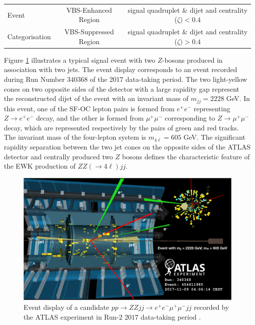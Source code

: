 \begin{table}[!htbp]
\begin{tabular}{|| l || c | c ||}
        Event               & VBS-Enhanced Region       & signal quadruplet $\&$ dijet and centrality ($\zeta) < 0.4 $              \\
        Categorisation          & VBS-Suppressed Region     & signal quadruplet $\&$ dijet and centrality ($\zeta) > 0.4$               \\
        
        \hline
    \end{tabular}
\end{table}

Figure \ref{fig:EventDisplayZZjj} illustrates a typical signal event with two $Z$-bosons produced in association with two jets. The event display corresponds to an event recorded during Run Number $340368$ of the 2017 data-taking period. The two light-yellow cones on two opposite sides of the detector with a large rapidity gap represent the reconstructed dijet of the event with an invariant mass of $m_{jj} = 2228$ GeV. In this event, one of the SF-OC lepton pairs is formed from $e^+e^-$ representing $Z\rightarrow e^+e^-$ decay, and the other is formed from $\mu^+\mu^-$ corresponding to $Z\rightarrow \mu^+\mu^-$ decay, which are represented respectively by the pairs of green and red tracks. The invariant mass of the four-lepton system is $m_{4\ell} = 605$ GeV. The significant rapidity separation between the two jet cones on the opposite sides of the ATLAS detector and centrally produced two $Z$ bosons defines the characteristic feature of the EWK production of $ZZ(\rightarrow 4\ell) jj$. 

\begin{figure}[!htbp]
\centering
\includegraphics[width=.9\linewidth]{figures/AnalysisOverview/ZZjjEventDisplay.png}  
\caption{Event display of a candidate $pp \rightarrow ZZjj \rightarrow e^+e^-\mu^+\mu^- jj $ recorded by the ATLAS experiment in Run-$2$ $2017$ data-taking period \label{fig:EventDisplayZZjj} \cite{ATLASZZjj}.}
\end{figure}